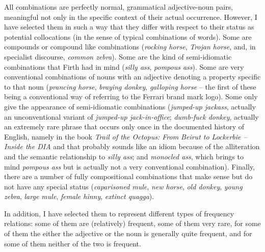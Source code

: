 
All combinations are perfectly normal, grammatical adjective\hyp{}noun  pairs, meaningful not only in the specific context of their actual occurrence. However, I have selected them in such a way that they differ with respect to their status as potential collocations  (in the sense of typical combinations of words). Some are compounds or compound like combinations (\textit{rocking horse}, \textit{Trojan horse}, and, in specialist discourse, \textit{common zebra}). Some are the kind of semi\hyp{}idiomatic  combinations that Firth had in mind (\textit{silly ass}, \textit{pompous ass}). Some are very conventional  combinations of nouns  with an adjective  denoting a property specific to that noun (\textit{prancing horse}, \textit{braying donkey}, \textit{galloping horse} -- the first of these being a conventional  way of referring to the Ferrari brand mark logo). Some only give the appearance of semi\hyp{}idiomatic  combinations (\textit{jumped-up jackass}, actually an unconventional variant of \textit{jumped-up jack-in-office}; \textit{dumb-fuck donkey}, actually an extremely rare phrase that occurs only once in the documented history of English, namely in the book \textit{Trail of the Octopus: From Beirut to Lockerbie -- Inside the DIA} and that probably sounds like an idiom  because of the alliteration and the semantic  relationship to \textit{silly ass}; and \textit{monocled ass}, which brings to mind \textit{pompous ass} but is actually not a very conventional  combination). Finally, there are a number of fully compositional  combinations that make sense but do not have any special status (\textit{caparisoned mule}, \textit{new horse}, \textit{old donkey}, \textit{young zebra}, \textit{large mule}, \textit{female hinny}, \textit{extinct quagga}).

In addition, I have selected them to represent different types of frequency  relations: some of them are (relatively) frequent, some of them very rare, for some of them the either the adjective  or the noun  is generally quite frequent, and for some of them neither of the two is frequent.


